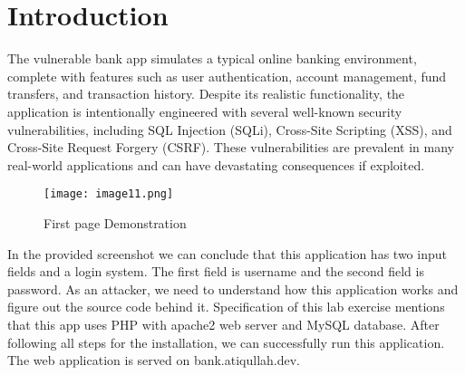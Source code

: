 \chapter{Introduction}\label{chap:introduction}

The vulnerable bank app simulates a typical online banking environment, complete with features such as user authentication, account management, fund transfers, and transaction history. Despite its realistic functionality, the application is intentionally engineered with several well-known security vulnerabilities, including SQL Injection (SQLi), Cross-Site Scripting (XSS), and Cross-Site Request Forgery (CSRF). 
These vulnerabilities are prevalent in many real-world applications and can have devastating consequences if exploited.
\begin{figure}[H]
	\centering
	\texttt{[image: image11.png]}
	\caption{First page Demonstration}
	\label{fig:image1}
\end{figure}
In the provided screenshot we can conclude that this application has two input fields and a login system. The first field is username and the second field is password. 
As an attacker, we need to understand how this application works and figure out the source code behind it. 
Specification of this lab exercise mentions that this app uses PHP with apache2 web server and MySQL database. After following all steps for the installation, we can successfully run this application. 
The web application is served on bank.atiqullah.dev.
